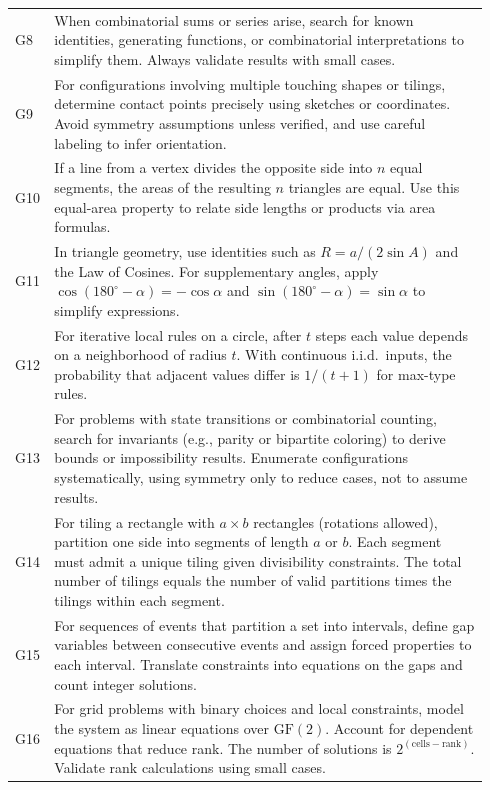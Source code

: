 \documentclass{article}
\theoremstyle{plain}
\theoremstyle{definition}
\theoremstyle{remark}
\begin{document}
\begin{table}[t]
\begin{tabular}{p{0.04\linewidth} p{0.9\linewidth}}
G8 & When combinatorial sums or series arise, search for known identities, generating functions, or combinatorial interpretations to simplify them. Always validate results with small cases. \\

G9 & For configurations involving multiple touching shapes or tilings, determine contact points precisely using sketches or coordinates. Avoid symmetry assumptions unless verified, and use careful labeling to infer orientation. \\

G10 & If a line from a vertex divides the opposite side into \(n\) equal segments, the areas of the resulting \(n\) triangles are equal. Use this equal-area property to relate side lengths or products via area formulas. \\

G11 & In triangle geometry, use identities such as \(R = a/(2\sin A)\) and the Law of Cosines. For supplementary angles, apply \(\cos(180^\circ-\alpha)=-\cos\alpha\) and \(\sin(180^\circ-\alpha)=\sin\alpha\) to simplify expressions. \\

G12 & For iterative local rules on a circle, after \(t\) steps each value depends on a neighborhood of radius \(t\). With continuous i.i.d.\ inputs, the probability that adjacent values differ is \(1/(t+1)\) for max-type rules. \\

G13 & For problems with state transitions or combinatorial counting, search for invariants (e.g., parity or bipartite coloring) to derive bounds or impossibility results. Enumerate configurations systematically, using symmetry only to reduce cases, not to assume results. \\

G14 & For tiling a rectangle with \(a\times b\) rectangles (rotations allowed), partition one side into segments of length \(a\) or \(b\). Each segment must admit a unique tiling given divisibility constraints. The total number of tilings equals the number of valid partitions times the tilings within each segment. \\

G15 & For sequences of events that partition a set into intervals, define gap variables between consecutive events and assign forced properties to each interval. Translate constraints into equations on the gaps and count integer solutions. \\

G16 & For grid problems with binary choices and local constraints, model the system as linear equations over \(\mathrm{GF}(2)\). Account for dependent equations that reduce rank. The number of solutions is \(2^{(\text{cells} - \text{rank})}\). Validate rank calculations using small cases. \\


\end{tabular}
\end{table}
\end{document}
